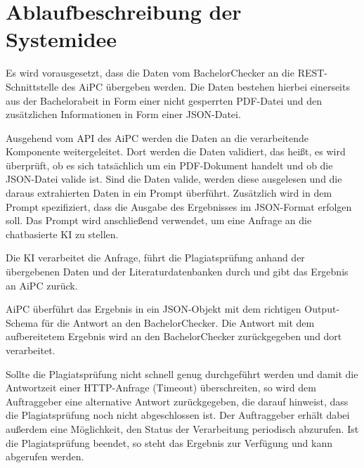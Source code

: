\chapter{Ablaufbeschreibung der Systemidee}\label{ch:ablaufbeschreibung}

Es wird vorausgesetzt, dass die Daten vom BachelorChecker an die \ac{REST}-Schnittstelle des \ac{AiPC} übergeben werden.
Die Daten bestehen hierbei einerseits aus der Bachelorabeit in Form einer nicht gesperrten \ac{PDF}-Datei und den zusätzlichen Informationen in Form einer \ac{JSON}-Datei.

Ausgehend vom \ac{API} des \ac{AiPC} werden die Daten an die verarbeitende Komponente weitergeleitet.
Dort werden die Daten validiert, das heißt, es wird überprüft, ob es sich tatsächlich um ein \ac{PDF}-Dokument handelt und ob die \ac{JSON}-Datei valide ist.
Sind die Daten valide, werden diese ausgelesen und die daraus extrahierten Daten in ein Prompt überführt.
Zusätzlich wird in dem Prompt spezifiziert, dass die Ausgabe des Ergebnisses im \ac{JSON}-Format erfolgen soll.
Das Prompt wird anschließend verwendet, um eine Anfrage an die chatbasierte \ac{KI} zu stellen.

Die \ac{KI} verarbeitet die Anfrage, führt die Plagiatsprüfung anhand der übergebenen Daten und der Literaturdatenbanken durch und gibt das Ergebnis an \ac{AiPC} zurück.

\ac{AiPC} überführt  das Ergebnis in ein \ac{JSON}-Objekt mit dem richtigen Output-Schema für die Antwort an den BachelorChecker.
Die Antwort mit dem aufbereitetem Ergebnis wird an den BachelorChecker zurückgegeben und dort verarbeitet.

Sollte die Plagiatsprüfung nicht schnell genug durchgeführt werden und damit die Antwortzeit einer \ac{HTTP}-Anfrage (Timeout) überschreiten,
so wird dem Auftraggeber eine alternative Antwort zurückgegeben, die darauf hinweist, dass die Plagiatsprüfung noch nicht abgeschlossen ist.
Der Auftraggeber erhält dabei außerdem eine Möglichkeit, den Status der Verarbeitung periodisch abzurufen.
Ist die Plagiatsprüfung beendet, so steht das Ergebnis zur Verfügung und kann abgerufen werden.